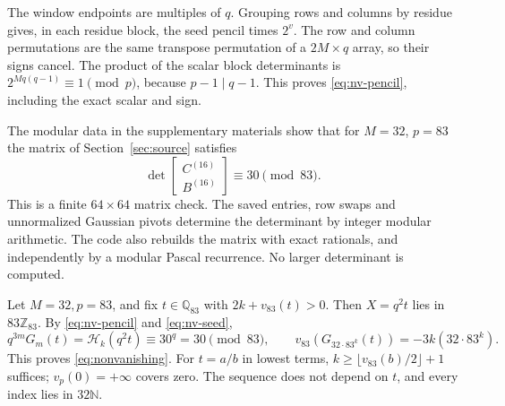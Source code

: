 The window endpoints are multiples of \(q\). Grouping rows and columns by
residue gives, in each residue block, the seed pencil times \(2^v\). The
row and column permutations are the same transpose permutation of a
\(2M\times q\) array, so their signs cancel. The product of the scalar
block determinants is \(2^{Mq(q-1)}\equiv1\pmod p\), because
\(p-1\mid q-1\). This proves \eqref{eq:nv-pencil}, including the exact
scalar and sign.

The modular data in the supplementary materials show that for \(M=32\),
\(p=83\) the matrix of Section~\ref{sec:source} satisfies
\begin{equation}\label{eq:nv-seed}
 \det\begin{bmatrix}C^{(16)}\\B^{(16)}\end{bmatrix}
                           \equiv30\pmod{83}.
\end{equation}
This is a finite \(64\times64\) matrix check. The saved entries, row swaps
and unnormalized Gaussian pivots determine the determinant by integer
modular arithmetic. The code also rebuilds the matrix with exact rationals,
and independently by a modular Pascal recurrence. No larger determinant is
computed.

Let \(M=32,p=83\), and fix \(t\in\mathbb Q_{83}\) with
\(2k+v_{83}(t)>0\). Then \(X=q^2t\) lies in \(83\mathbb Z_{83}\). By
\eqref{eq:nv-pencil} and \eqref{eq:nv-seed},
\begin{equation}\label{eq:nv-final}
 q^{3m}G_m(t)=\mathcal H_k(q^2t)\equiv30^q=30\pmod{83},
 \qquad v_{83}(G_{32\cdot83^k}(t))=-3k(32\cdot83^k).
\end{equation}
This proves \eqref{eq:nonvanishing}. For \(t=a/b\) in lowest terms,
\(k\ge\lfloor v_{83}(b)/2\rfloor+1\) suffices; \(v_p(0)=+\infty\) covers
zero. The sequence does not depend on \(t\), and every index lies in
\(32\mathbb N\).
